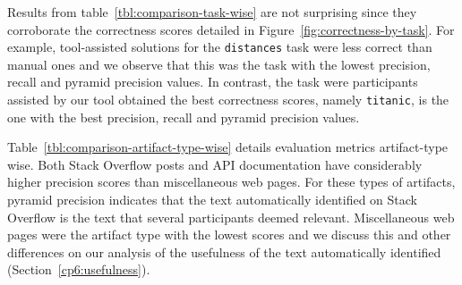 Results from table~\ref{tbl:comparison-task-wise} are not surprising since they corroborate 
the correctness scores detailed in Figure~\ref{fig:correctness-by-task}. For example, 
tool-assisted solutions for the \texttt{distances} task were less correct than manual ones and 
we observe that this was the task with the lowest precision, recall and pyramid precision values. 
In contrast, the task were participants assisted by our tool obtained the best correctness scores, namely \texttt{titanic}, is the one with the best precision, recall and pyramid precision values.









Table~\ref{tbl:comparison-artifact-type-wise} details evaluation metrics artifact-type wise. 
Both Stack Overflow posts and API documentation have considerably higher precision scores than 
miscellaneous web pages. For these types of artifacts, pyramid precision indicates that the 
text automatically identified on Stack Overflow is the text that several participants deemed relevant. Miscellaneous web pages were the artifact type with the lowest scores and we 
discuss this and other differences on our analysis of the usefulness of the text 
automatically identified (Section~\ref{cp6:usefulness}).










